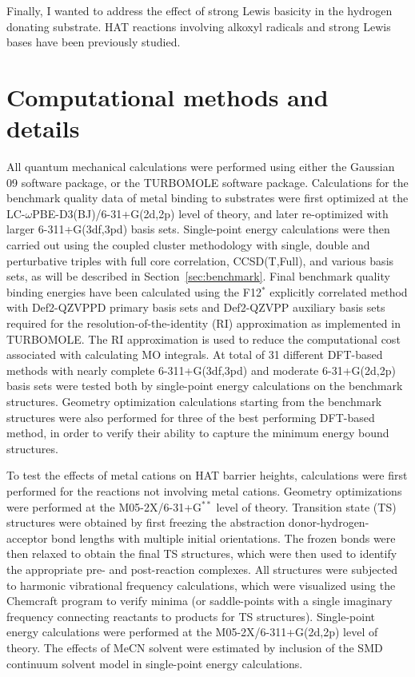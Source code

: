 Finally, I wanted to address the effect of strong Lewis basicity in the hydrogen donating substrate. HAT reactions involving alkoxyl radicals and strong Lewis bases have been previously studied.%



\section{Computational methods and details}

All quantum mechanical calculations were performed using either the Gaussian 09 software package,\cite{Frisch2009} or the TURBOMOLE software package.\cite{turbomole} Calculations for the benchmark quality data of metal binding to substrates were first optimized at the LC-$\omega$PBE-D3(BJ)/6-31+G(2d,2p) level of theory, and later re-optimized with larger 6-311+G(3df,3pd) basis sets. Single-point energy calculations were then carried out using the coupled cluster methodology with single, double and perturbative triples with full core correlation, CCSD(T,Full), and various basis sets, as will be described in Section~\ref{sec:benchmark}. Final benchmark quality binding energies have been calculated using the F12$^*$ explicitly correlated method with Def2-QZVPPD primary basis sets and Def2-QZVPP auxiliary basis sets required for the resolution-of-the-identity (RI) approximation as implemented in TURBOMOLE. The RI approximation is used to reduce the computational cost associated with calculating MO integrals. At total of 31 different DFT-based methods with nearly complete 6-311+G(3df,3pd) and moderate 6-31+G(2d,2p) basis sets were tested both by single-point energy calculations on the benchmark structures. Geometry optimization calculations starting from the benchmark structures were also performed for three of the best performing DFT-based method, in order to verify their ability to capture the minimum energy bound structures.

To test the effects of metal cations on HAT barrier heights, calculations were first performed for the reactions not involving metal cations. Geometry optimizations were performed at the M05-2X/6-31+G$^{**}$ level of theory. Transition state (TS) structures were obtained by first freezing the abstraction donor-hydrogen-acceptor bond lengths with multiple initial orientations. The frozen bonds were then relaxed to obtain the final TS structures, which were then used to identify the appropriate pre- and post-reaction complexes. All structures were subjected to harmonic vibrational frequency calculations, which were visualized using the Chemcraft program\cite{ccraft} to verify minima (or saddle-points with a single imaginary frequency connecting reactants to products for TS structures). Single-point energy calculations were performed at the M05-2X/6-311+G(2d,2p) level of theory. The effects of MeCN solvent were estimated by inclusion of the SMD continuum solvent model in single-point energy calculations.

